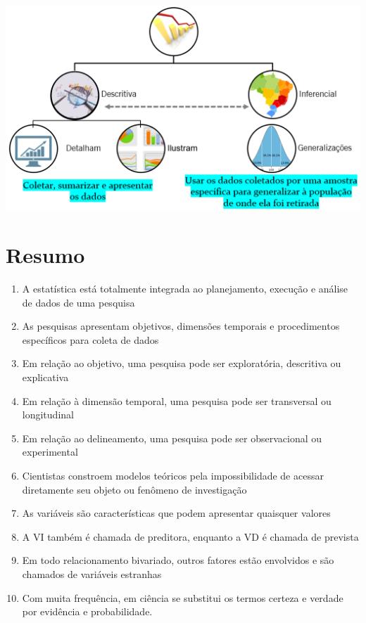 \documentclass[
]{book}
\providecommand{\tightlist}{%
  \setlength{\itemsep}{0pt}\setlength{\parskip}{0pt}}
\newenvironment{explore}{
  \definecolor{shadecolor}{rgb}{0, 0, 0}  %
  \color{white}
  \begin{shaded}}
 {\end{shaded}}
\begin{document}
\includegraphics{./img/cap_areas_estatistica.png}

\hypertarget{resumo-1}{%
\section{Resumo}\label{resumo-1}}

\begin{explore}

\begin{enumerate}
\def\labelenumi{\arabic{enumi}.}
\tightlist
\item
  A estatística está totalmente integrada ao planejamento, execução e análise de dados de uma pesquisa\\
\item
  As pesquisas apresentam objetivos, dimensões temporais e procedimentos específicos para coleta de dados\\
\item
  Em relação ao objetivo, uma pesquisa pode ser exploratória, descritiva ou explicativa\\
\item
  Em relação à dimensão temporal, uma pesquisa pode ser transversal ou longitudinal\\
\item
  Em relação ao delineamento, uma pesquisa pode ser observacional ou experimental\\
\item
  Cientistas constroem modelos teóricos pela impossibilidade de acessar diretamente seu objeto ou fenômeno de investigação\\
\item
  As variáveis são características que podem apresentar quaisquer valores\\
\item
  A VI também é chamada de preditora, enquanto a VD é chamada de prevista\\
\item
  Em todo relacionamento bivariado, outros fatores estão envolvidos e são chamados de variáveis estranhas\\
\item
  Com muita frequência, em ciência se substitui os termos certeza e verdade por evidência e probabilidade.
\end{enumerate}

\end{explore}
\end{document}

